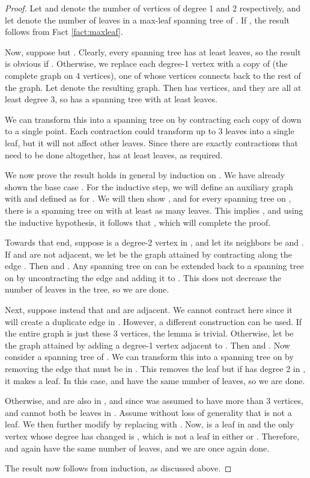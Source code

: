 \documentclass[letterpaper,twoside]{article}
\begin{document}
\begin{proof}
    Let  and  denote the number of vertices of degree 1
    and 2 respectively, and let  denote the number of leaves in a
    max-leaf spanning tree of . If , the result
    follows from Fact \ref{fact:maxleaf}.

    Now, suppose  but . Clearly, every spanning
    tree has at least  leaves, so the result is obvious if
    . Otherwise, we replace each degree-1 vertex
    with a copy of  (the complete graph on 4 vertices), one of whose
    vertices connects back to the rest of the graph. Let  denote the
    resulting graph. Then  has  vertices, and they are all at
    least degree 3, so  has a spanning tree  with at
    least  leaves.

    We can transform this into a spanning tree  on  by
    contracting each copy of  down to a single point. Each
    contraction could transform up to 3 leaves into a single leaf,
    but it will not affect other leaves. Since there are exactly
     contractions that need to be done altogether,  has at
    least 
    leaves, as required.

    We now prove the result holds in general by induction on .
    We have already shown the base case . For the inductive step, we
    will define an auxiliary graph  with  and 
    defined as for . We will then show
    , and for every spanning tree  on ,
    there is a spanning tree  on  with at least as many leaves. This
    implies , and using the inductive hypothesis, it
    follows that , which will complete the proof.

    Towards that end, suppose  is a degree-2 vertex in , and
    let its neighbors be  and . If  and  are not
    adjacent, we let  be the graph attained by contracting along
    the edge . Then  and . Any
    spanning tree  on  can be extended back to a spanning
    tree  on  by uncontracting the edge  and adding it
    to . This does not decrease the number of leaves in the tree,
    so we are done.

    Next, suppose instead that  and  are adjacent. We cannot
    contract  here since it will create a duplicate edge in .
    However, a different construction can be used. If the entire graph is
    just these 3 vertices, the lemma is trivial. Otherwise, let 
    be the graph attained by adding a degree-1 vertex  adjacent
    to . Then  and . Now consider
    a spanning tree  of . We can transform this into a
    spanning tree  on  by removing the edge  that must
    be in . This removes the leaf  but if  has degree 2
    in , it makes  a leaf. In this case,  and  have the same
    number of leaves, so we are done.

    Otherwise,  and  are also in , and since 
    was assumed to have more than 3 vertices,  and  cannot
    both be leaves in . Assume without loss of generality that
     is not a leaf. We then further modify  by replacing  with
    . Now,  is a leaf in  and the only vertex whose
    degree has changed is , which is not a leaf in either  or
    . Therefore,  and  again have the same number of
    leaves, and we are once again done.

    The result now follows from induction, as discussed above.
\end{proof}
\end{document}
